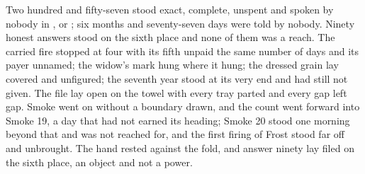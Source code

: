 Two hundred and fifty-seven stood exact, complete, unspent and spoken by nobody in ,  or ; six months and seventy-seven days were told by nobody. Ninety honest answers stood on the sixth place and none of them was a reach. The carried fire stopped at four with its fifth unpaid the same number of days and its payer unnamed; the widow's mark hung where it hung; the dressed grain lay covered and unfigured; the seventh year stood at its very end and had still not given. The file lay open on the towel with every tray parted and every gap left gap. Smoke went on without a boundary drawn, and the count went forward into Smoke 19, a day that had not earned its heading; Smoke 20 stood one morning beyond that and was not reached for, and the first firing of Frost stood far off and unbrought. The hand rested against the fold, and answer ninety lay filed on the sixth place, an object and not a power.
